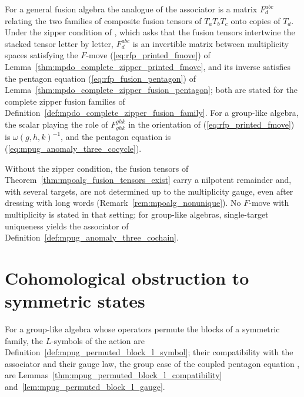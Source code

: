 \begin{remark}%
    \label{rem:mpoalg_f_symbols}
    For a general fusion algebra the analogue of the associator is a matrix
    $F^{abc}_d$ relating the two families of composite fusion tensors of
    $T_aT_bT_c$ onto copies of $T_d$. Under the zipper condition of
    \cite{Bultinck2017Anyons}, which asks that the fusion tensors intertwine
    the stacked tensor letter by letter, $F^{abc}_d$ is an invertible matrix
    between multiplicity spaces satisfying the $F$-move
    (\ref{eq:rfp_printed_fmove}) of
    Lemma~\ref{thm:mpdo_complete_zipper_printed_fmove}, and its inverse
    satisfies the pentagon equation (\ref{eq:rfp_fusion_pentagon}) of
    Lemma~\ref{thm:mpdo_complete_zipper_fusion_pentagon}; both are stated
    for the complete zipper fusion families of
    Definition~\ref{def:mpdo_complete_zipper_fusion_family}. For a group-like
    algebra, the scalar playing the role of $F^{ghk}_{ghk}$ in the orientation
    of (\ref{eq:rfp_printed_fmove}) is $\omega(g,h,k)^{-1}$, and the pentagon
    equation is
    (\ref{eq:mpug_anomaly_three_cocycle}).

    Without the zipper condition, the fusion tensors of
    Theorem~\ref{thm:mpoalg_fusion_tensors_exist} carry a nilpotent remainder
    and, with several targets, are not determined up to the multiplicity
    gauge, even after dressing with long words
    (Remark~\ref{rem:mpoalg_nonunique}). No $F$-move with multiplicity is
    stated in that setting; for group-like algebras, single-target uniqueness
    yields the associator of Definition~\ref{def:mpug_anomaly_three_cochain}.
\end{remark}

\section{Cohomological obstruction to symmetric states}%
\label{sec:mpoalg_obstruction}

For a group-like algebra whose operators permute the blocks of a symmetric
family, the $L$-symbols of the action are
Definition~\ref{def:mpug_permuted_block_l_symbol}; their compatibility
with the associator and their gauge law, the group case of the coupled
pentagon equation \cite[Section~4]{GarreRubio2023MPOSym}, are
Lemmas~\ref{thm:mpug_permuted_block_l_compatibility}
and~\ref{lem:mpug_permuted_block_l_gauge}.

